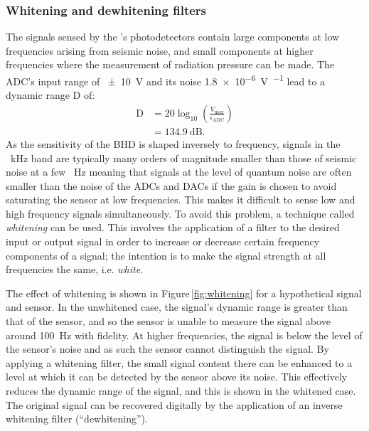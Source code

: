 \subsubsection{\label{sec:whitening-dewhitening}Whitening and dewhitening filters}
The signals sensed by the \SSMEXPT{}'s photodetectors contain large components at low frequencies arising from seismic noise, and small components at higher frequencies where the measurement of radiation pressure can be made. The \gls{ADC}'s input range of \SI{\pm10}{\volt} and its noise \SI{1.8e-6}{\volt\per\sqrthz} lead to a dynamic range $\text{D}$ of:
\begin{equation}
  \begin{split}
    \text{D} &= 20 \log_{10} \left( \frac{V_{\text{max}}}{\epsilon_{\text{ADC}}} \right) \\
             &= \SI{134.9}{\deci\bel}.
  \end{split}
\end{equation}
As the \LMINUS{} sensitivity of the \gls{BHD} is shaped inversely to frequency, signals in the \SI{}{\kilo\hertz} band are typically many orders of magnitude smaller than those of seismic noise at a few \SI{}{\hertz} meaning that signals at the level of quantum noise are often smaller than the noise of the \glspl{ADC} and \glspl{DAC} if the gain is chosen to avoid saturating the sensor at low frequencies. This makes it difficult to sense low and high frequency signals simultaneously. To avoid this problem, a technique called \emph{whitening} can be used. This involves the application of a filter to the desired input or output signal in order to increase or decrease certain frequency components of a signal; the intention is to make the signal strength at all frequencies the same, i.e. \emph{white}.

The effect of whitening is shown in Figure\,\ref{fig:whitening} for a hypothetical signal and sensor. In the unwhitened case, the signal's dynamic range is greater than that of the sensor, and so the sensor is unable to measure the signal above around \SI{100}{\hertz} with fidelity. At higher frequencies, the signal is below the level of the sensor's noise and as such the sensor cannot distinguish the signal. By applying a whitening filter, the small signal content there can be enhanced to a level at which it can be detected by the sensor above its noise. This effectively reduces the dynamic range of the signal, and this is shown in the whitened case. The original signal can be recovered digitally by the application of an inverse whitening filter (``dewhitening'').

